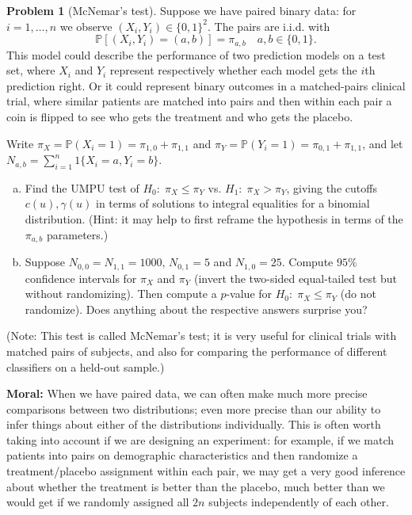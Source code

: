 \documentclass{article}
\newcommand{\PP}{\mathbb{P}}
\theoremstyle{definition}
\newtheorem{problem}{Problem}
\begin{document}
\begin{problem}[McNemar's test]
\label{prob:mcnemar-test}
Suppose we have paired binary data: for $i=1,\ldots,n$ we observe $(X_i,Y_i)\in \{0,1\}^2$. The pairs are i.i.d. with
\[
\PP\left[(X_i,Y_i) = (a,b)\right] = \pi_{a,b} \quad a,b\in \{0,1\}.
\]
This model could describe the performance of two prediction models on a test set, where $X_i$ and $Y_i$ represent respectively whether each model gets the $i$th prediction right. Or it could represent binary outcomes in a matched-pairs clinical trial, where similar patients are matched into pairs and then within each pair a coin is flipped to see who gets the treatment and who gets the placebo.

Write $\pi_X = \PP(X_i=1) = \pi_{1,0}+\pi_{1,1}$ and $\pi_Y = \PP(Y_i=1) = \pi_{0,1}+\pi_{1,1}$, and let $N_{a,b} = \sum_{i=1}^n 1\{X_i=a,Y_i=b\}$.

\begin{enumerate}[(a)]
\item Find the UMPU test of $H_0:\; \pi_X \leq \pi_Y$ vs. $H_1:\; \pi_X > \pi_Y$, giving the cutoffs $c(u), \gamma(u)$ in terms of solutions to integral equalities for a binomial distribution. (Hint: it may help to first reframe the hypothesis in terms of the $\pi_{a,b}$ parameters.)



\item Suppose $N_{0,0} = N_{1,1} = 1000$, $N_{0,1} = 5$ and $N_{1,0}=25$. Compute $95\%$ confidence intervals for $\pi_X$ and $\pi_Y$ (invert the two-sided equal-tailed test but without randomizing). Then compute a $p$-value for $H_0:\; \pi_X\leq\pi_Y$ (do not randomize). Does anything about the respective answers surprise you?



\end{enumerate}

(Note: This test is called McNemar's test; it is very useful for clinical trials with matched pairs of subjects, and also for comparing the performance of different classifiers on a held-out sample.)

  {\bf Moral:} When we have paired data, we can often make much more precise comparisons between two distributions; even more precise than our ability to infer things about either of the distributions individually. This is often worth taking into account if we are designing an experiment: for example, if we match patients into pairs on demographic characteristics and then randomize a treatment/placebo assignment within each pair, we may get a very good inference about whether the treatment is better than the placebo, much better than we would get if we randomly assigned all $2n$ subjects independently of each other.
\end{problem}
\end{document}
